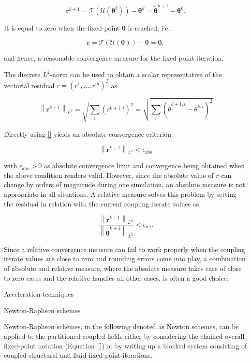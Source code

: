 $$
\mathbf r^{k+1} = \mathcal T\left(\mathcal U(\boldsymbol\theta^k)\right) - \boldsymbol\theta^k = \tilde{\boldsymbol \theta}^{k+1} - \boldsymbol\theta^k.
$$

It is equal to zero when the fixed-point $\boldsymbol \theta$ is reached, i.e.,

$$
\mathbf r = \mathcal T\left(\mathcal U(\boldsymbol \theta)\right) - \boldsymbol \theta = \mathbf 0,
$$

and hence, a reasonable convergence measure for the fixed-point iteration.

The discrete  $L^{2}$-norm can be used to obtain a scalar representative of the vectorial residual $r=\left(r^{1}, \ldots, r^{m}\right)^{T}$ as

$$
\left\|\mathbf{r}^{k+1}\right\|_{L^{2}}=\sqrt{\sum_{i}\left(r^{k+1, i}\right)^{2}}=\sqrt{\sum_{i}\left(\tilde{\theta}^{k+1, i}-\theta^{k, i}\right)^{2}}
$$

Directly using \eqref{} yields an absolute convergence criterion

$$
\left\|\boldsymbol{r} ^{k+1}\right\|_{L^{2}}<\epsilon_\mathrm{abs}
$$

with $\epsilon_\mathrm{abs}>0$ as absolute convergence limit and convergence being obtained when the above condition renders valid. However, since the absolute value of $r$ can change by orders of magnitude during one simulation, an absolute measure is not appropriate in all situations. A relative measure solves this problem by setting the residual in relation with the current coupling iterate values as

$$
\frac{\left\|\mathbf{r}^{k+1}\right\|_{L^{2}}}{\left\|\tilde{\boldsymbol{\theta}}^{k+1}\right\|_{L^{2}}}<\epsilon_\mathrm{rel}.
$$

Since a relative convergence measure can fail to work properly when the coupling iterate values are close to zero and rounding errors come into play, a combination of absolute and relative measure, where the absolute measure takes care of close to zero cases and the relative handles all other cases, is often a good choice.

 Acceleration techniques

 Newton-Raphson schemes

Newton-Raphson schemes, in the following denoted as Newton schemes, can be applied to the partitioned coupled fields either by considering the chained overall fixed-point notation (Equation~\eqref{}) or by writing up a blocked system consisting of coupled structural and fluid fixed-point iterations.

